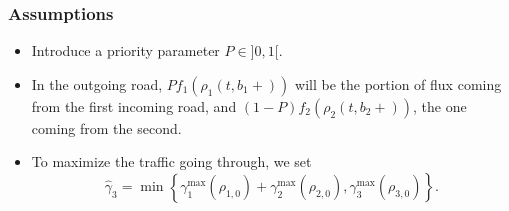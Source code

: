 \begin{frame}[fragile]
	\frametitle{Assumptions}
\begin{itemize}
	\item Introduce a priority parameter $P \in ]0,1[$.
	\vspace*{5mm}
	\item In the outgoing road, $Pf_1(\rho_1(t,b_1+))$ will be the portion of flux coming from the first incoming road, and $(1-P)f_2(\rho_2(t,b_2+))$, the one coming from the second. 
	\vspace*{5mm}	
	\item To maximize the traffic going through, we set $$\hat{\gamma}_3=\min{\left\lbrace\gamma_1^{\max}(\rho_{1,0})+\gamma_2^{\max}(\rho_{2,0}),\gamma_3^{\max}(\rho_{3,0})\right\rbrace} .$$
	
\end{itemize}

\end{frame}

